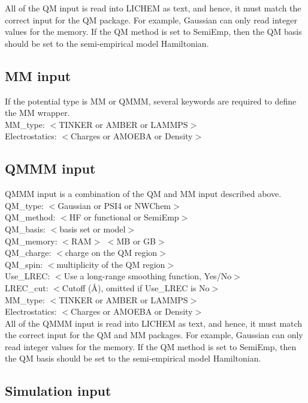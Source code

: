 \documentclass[12pt]{report}
\begin{document}
All of the QM input is read into LICHEM as text, and hence, it must match the
correct input for the QM package.
For example, Gaussian can only read integer values for the memory.
If the QM method is set to SemiEmp, then the QM basis should be set to the
semi-empirical model Hamiltonian.

\subsection{MM input}

If the potential type is MM or QMMM, several keywords are required to define
the MM wrapper. \\

MM\_type: $<$TINKER or AMBER or LAMMPS$>$ \\
Electrostatics: $<$Charges or AMOEBA or Density$>$ \\

\subsection{QMMM input}

QMMM input is a combination of the QM and MM input described above. \\

QM\_type: $<$Gaussian or PSI4 or NWChem$>$ \\
QM\_method: $<$HF or functional or SemiEmp$>$ \\
QM\_basis: $<$basis set or model$>$ \\
QM\_memory: $<$RAM$>$ $<$MB or GB$>$ \\
QM\_charge: $<$charge on the QM region$>$ \\
QM\_spin: $<$multiplicity of the QM region$>$ \\
Use\_LREC: $<$Use a long-range smoothing function, Yes/No$>$ \\
LREC\_cut: $<$Cutoff (\AA), omitted if Use\_LREC is No$>$ \\
MM\_type: $<$TINKER or AMBER or LAMMPS$>$ \\
Electrostatics: $<$Charges or AMOEBA or Density$>$ \\

All of the QMMM input is read into LICHEM as text, and hence, it must match the
correct input for the QM and MM packages.
For example, Gaussian can only read integer values for the memory.
If the QM method is set to SemiEmp, then the QM basis should be set to the
semi-empirical model Hamiltonian.

\subsection{Simulation input}
\end{document}
